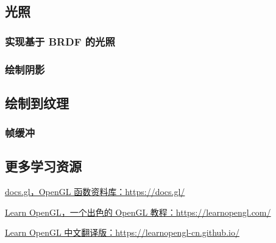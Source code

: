 \documentclass[fontset=windows]{ctexart}
\begin{document}
\subsection{光照}

\subsubsection{实现基于 BRDF 的光照}

\subsubsection{绘制阴影}

\subsection{绘制到纹理}

\subsubsection{帧缓冲}

\subsection{更多学习资源}

\label{sec-gl:study-resources}

\href{https://docs.gl}{docs.gl，OpenGL 函数资料库：https://docs.gl/}

\href{https://learnopengl.com/}{Learn OpenGL，一个出色的 OpenGL 教程：https://learnopengl.com/}

\href{https://learnopengl-cn.github.io/}{Learn OpenGL 中文翻译版：https://learnopengl-cn.github.io/}
\end{document}
